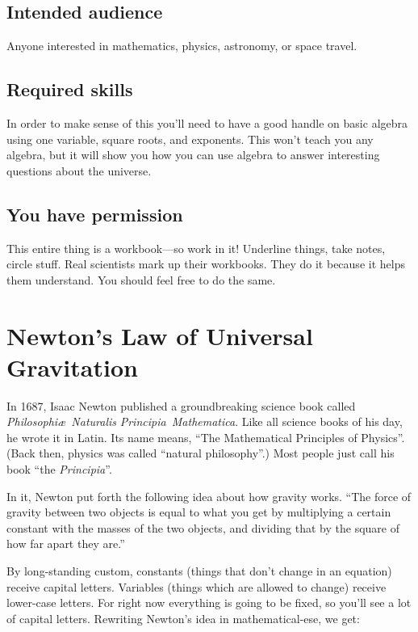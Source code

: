 \documentclass[12pt,letterpaper]{article}
\begin{document}
\subsection{Intended audience}
Anyone interested in mathematics, physics, astronomy, or space
travel.

\subsection{Required skills}
In order to make sense of this you'll need to have a good handle on
basic algebra using one variable, square roots, and exponents.  This
won't teach you any algebra, but it will show you how you can use
algebra to answer interesting questions about the universe.

\subsection{You have permission}
This entire thing is a workbook---so work in it!  Underline things, take
notes, circle stuff.  Real scientists mark up their workbooks.  They
do it because it helps them understand.  You should feel free to do
the same.

\section{Newton's Law of Universal Gravitation}

In 1687, Isaac Newton published a groundbreaking science book called \\
\mbox{\textit{Philosophi\ae{} Naturalis}} \mbox{\textit{Principia
    Mathematica}}.  Like all science books of his day, he wrote it in
Latin.  Its name means, ``The Mathematical Principles of
Physics''.  (Back then, physics was called ``natural
  philosophy''.)  Most people just call his book ``the
  \textit{Principia}''.

In it, Newton put forth the following idea about how gravity works.
``The force of gravity between two objects is equal to what
you get by multiplying a certain constant with the masses of the two
objects, and dividing that by the square of how far apart they
are.''

By long-standing custom, constants (things that don't change in an
equation) receive capital letters.  Variables (things which are
allowed to change) receive lower-case letters.  For right now
everything is going to be fixed, so you'll see a lot of capital
letters.  Rewriting Newton's idea in mathematical-ese, we get:
\end{document}
